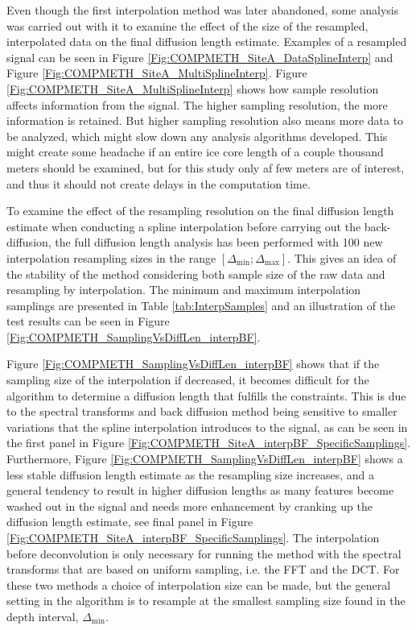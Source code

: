 \documentclass[../../CompleteThesis2/Complete_2ndDraft]{subfiles}
\begin{document}
Even though the first interpolation method was later abandoned, some analysis was carried out with it to examine the effect of the size of the resampled, interpolated data on the final diffusion length estimate. Examples of a resampled signal can be seen in Figure \ref{Fig:COMPMETH_SiteA_DataSplineInterp} and Figure \ref{Fig:COMPMETH_SiteA_MultiSplineInterp}. Figure \ref{Fig:COMPMETH_SiteA_MultiSplineInterp} shows how sample resolution affects information from the signal. The higher sampling resolution, the more information is retained. But higher sampling resolution also means more data to be analyzed, which might slow down any analysis algorithms developed. This might create some headache if an entire ice core length of a couple thousand meters should be examined, but for this study only af few meters are of interest, and thus it should not create delays in the computation time.

To examine the effect of the resampling resolution on the final diffusion length estimate when conducting a spline interpolation before carrying out the back-diffusion, the full diffusion length analysis has been performed with 100 new interpolation resampling sizes in the range $[\Delta_{\text{min}};\Delta_{\text{max}}]$. This gives an idea of the stability of the method considering both sample size of the raw data and resampling by interpolation. The minimum and maximum interpolation samplings are presented in Table \ref{tab:InterpSamples} and an illustration of the test results can be seen in Figure \ref{Fig:COMPMETH_SamplingVsDiffLen_interpBF}. 

Figure \ref{Fig:COMPMETH_SamplingVsDiffLen_interpBF} shows that if the sampling size of the interpolation if decreased, it becomes difficult for the algorithm to determine a diffusion length that fulfills the constraints. This is due to the spectral transforms and back diffusion method being sensitive to smaller variations that the spline interpolation introduces to the signal, as can be seen in the first panel in Figure \ref{Fig:COMPMETH_SiteA_interpBF_SpecificSamplings}. Furthermore, Figure \ref{Fig:COMPMETH_SamplingVsDiffLen_interpBF} shows a less stable diffusion length estimate as the resampling size increases, and a general tendency to result in higher diffusion lengths as many features become washed out in the signal and needs more enhancement by cranking up the diffusion length estimate, see final panel in Figure \ref{Fig:COMPMETH_SiteA_interpBF_SpecificSamplings}. The interpolation before deconvolution is only necessary for running the method with the spectral transforms that are based on uniform sampling, i.e. the FFT and the DCT. For these two methods a choice of interpolation size can be made, but the general setting in the algorithm is to resample at the smallest sampling size found in the depth interval, $\Delta_{\text{min}}$.
\end{document}
